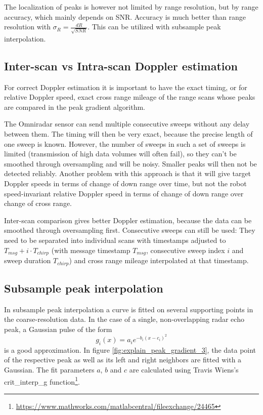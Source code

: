 The localization of peaks is however not limited by range resolution,
but by range accuracy, which mainly depends on SNR. Accuracy is much better
than range resolution with \(\sigma_R = \frac{dR}{\sqrt{SNR}}\). This
can be utilized with subsample peak interpolation.

\subsection{Inter-scan vs Intra-scan Doppler estimation} \label{inter-scan-vs-intra-scan-doppler-estimation}

For correct Doppler estimation it is important to have the exact timing,
or for relative Doppler speed, exact cross range mileage of the range
scans whose peaks are compared in the peak gradient algorithm.

The Omniradar sensor can send multiple consecutive sweeps without any
delay between them. The timing will then be very exact, because the
precise length of one sweep is known. However, the number of sweeps in
such a set of sweeps is limited (transmission of high data volumes will
often fail), so they can't be smoothed through
oversampling and will be noisy. Smaller peaks will then not be detected
reliably. Another problem with this approach is that it will give target
Doppler speeds in terms of change of down range over time, but not the robot
speed-invariant relative Doppler speed in terms of change of down range over
change of cross range.

Inter-scan comparison gives better Doppler estimation, because the data
can be smoothed through oversampling first. Consecutive sweeps can still
be used: They need to be separated into individual scans with timestamps
adjusted to \(T_{msg} + i\cdot T_{chirp}\) (with message timestamp
\(T_{msg}\), consecutive sweep index \(i\) and sweep duration
\(T_{chirp}\)) and cross range mileage interpolated at that timestamp.

\subsection{Subsample peak interpolation}\label{subsample-peak-interpolation}

In subsample peak interpolation a curve is fitted on several supporting
points in the coarse-resolution data. In the case of a single,
non-overlapping radar echo peak, a Gaussian pulse of the form
\[g_i(x) = a_i e^{-b_i ( x - c_i )^2}\] is a good approximation. In
figure \cref{fig:explain_peak_gradient_3}, the data point of the respective peak as well as its left
and right neighbors are fitted with a Gaussian. The fit parameters
\(a\), \(b\) and \(c\) are calculated using Travis
Wiens's crit\_interp\_g function\footnote{\url{https://www.mathworks.com/matlabcentral/fileexchange/24465}}.

